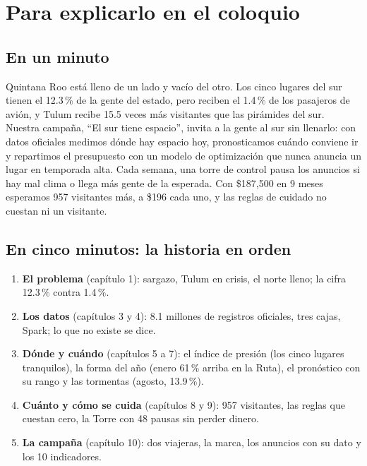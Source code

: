 \chapter{Para explicarlo en el coloquio}
\label{cap:s-explicar}

\section{En un minuto}
\begin{cita}
Quintana Roo está lleno de un lado y vacío del otro. Los cinco lugares del sur tienen el 12.3\,\% de la gente del estado,
pero reciben el 1.4\,\% de los pasajeros de avión, y Tulum recibe 15.5 veces más visitantes que las pirámides del sur.
Nuestra campaña, ``El sur tiene espacio'', invita a la gente al sur sin llenarlo: con datos oficiales medimos dónde hay
espacio hoy, pronosticamos cuándo conviene ir y repartimos el presupuesto con un modelo de optimización que nunca anuncia
un lugar en temporada alta. Cada semana, una torre de control pausa los anuncios si hay mal clima o llega más gente de la
esperada. Con \$187,500 en 9 meses esperamos 957 visitantes más, a \$196 cada uno, y las reglas de cuidado no cuestan ni un
visitante.
\end{cita}

\section{En cinco minutos: la historia en orden}
\begin{enumerate}
\item \textbf{El problema} (capítulo 1): sargazo, Tulum en crisis, el norte lleno; la cifra 12.3\,\% contra 1.4\,\%.
\item \textbf{Los datos} (capítulos 3 y 4): 8.1 millones de registros oficiales, tres cajas, Spark; lo que no existe se
  dice.
\item \textbf{Dónde y cuándo} (capítulos 5 a 7): el índice de presión (los cinco lugares tranquilos), la forma del año
  (enero 61\,\% arriba en la Ruta), el pronóstico con su rango y las tormentas (agosto, 13.9\,\%).
\item \textbf{Cuánto y cómo se cuida} (capítulos 8 y 9): 957 visitantes, las reglas que cuestan cero, la Torre con 48
  pausas sin perder dinero.
\item \textbf{La campaña} (capítulo 10): dos viajeras, la marca, los anuncios con su dato y los 10 indicadores.
\end{enumerate}

